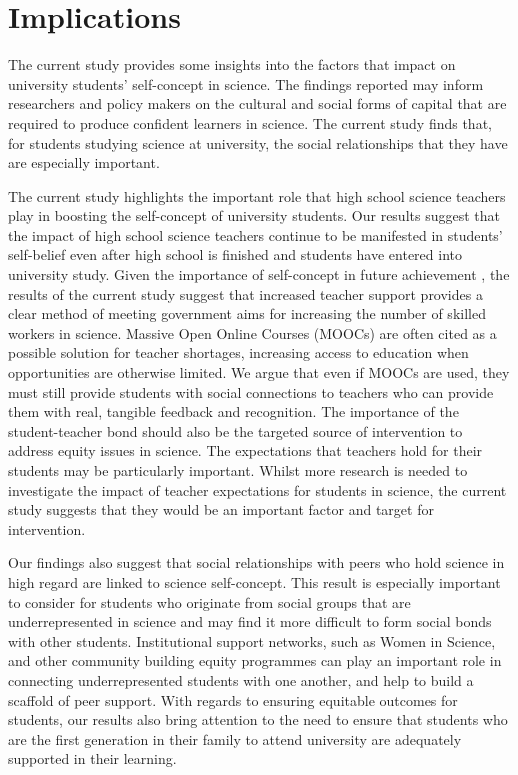 \documentclass[smallextended]{svjour3}       %
\begin{document}
\section*{Implications}
The current study provides some insights into the factors that impact on university students' self-concept in science. The findings reported may inform researchers and policy makers on the cultural and social forms of capital that are required to produce confident learners in science. The current study finds that, for students studying science at university, the social relationships that they have are especially important.

The current study highlights the important role that high school science teachers play in boosting the self-concept of university students. Our results suggest that the impact of high school science teachers continue to be manifested in students' self-belief even after high school is finished and students have entered into university study. Given the importance of self-concept in future achievement \cite{uccar2017role,chang2008science}, the results of the current study suggest that increased teacher support provides a clear method of meeting government aims for increasing the number of skilled workers in science. Massive Open Online Courses (MOOCs) are often cited as a possible solution for teacher shortages, increasing access to education when opportunities are otherwise limited. We argue that even if MOOCs are used, they must still provide students with social connections to teachers who can provide them with real, tangible feedback and recognition. The importance of the student-teacher bond should also be the targeted source of intervention to address equity issues in science. The expectations that teachers hold for their students may be particularly important.\cite{rubie2006teacher} Whilst more research is needed to investigate the impact of teacher expectations for students in science, the current study suggests that they would be an important factor and target for intervention.

Our findings also suggest that social relationships with peers who hold science in high regard are linked to science self-concept. This result is especially important to consider for students who originate from social groups that are underrepresented in science and may find it more difficult to form social bonds with other students. Institutional support networks, such as Women in Science, and other community building equity programmes can play an important role in connecting underrepresented students with one another, and help to build a scaffold of peer support.  With regards to ensuring equitable outcomes for students, our results also bring attention to the need to ensure that students who are the first generation in their family to attend university are adequately supported in their learning.  
\end{document}
